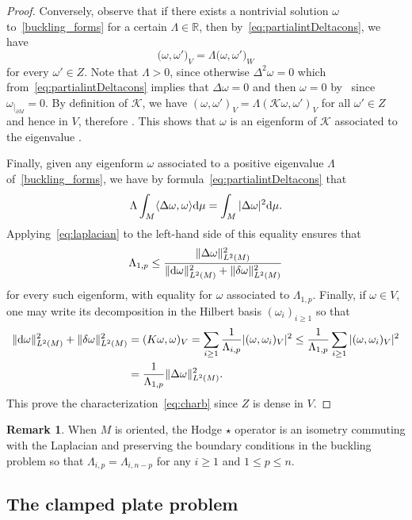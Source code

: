 \documentclass[pdftex]{sigma}
\newcommand{\R}{{\mathbb R}}
\numberwithin{equation}{section}
\theoremstyle{definition}
\newtheorem{Remark}[Theorem]{Remark}
\begin{document}
\begin{proof}
Conversely, observe that if there exists a nontrivial solution $\omega$ to~\eqref{buckling_forms} for a certain $\Lambda\in\R$, then by~\eqref{eq:partialintDeltacons}, we have
\[
\bigl(\omega,\omega'\bigr)_V=\Lambda\bigl(\omega,\omega'\bigr)_W
\]
for every $\omega'\in Z$. Note that $\Lambda>0$, since otherwise $\Delta^2\omega=0$ which from~\eqref{eq:partialintDeltacons} implies that $\Delta\omega=0$ and then $\omega=0$ by~\cite{Anne89} since $\omega_{|_{\partial M}}=0$.
By definition of $\mathcal{K}$, we have $(\omega,\omega')_V=\Lambda(\mathcal{K}\omega,\omega')_V$ for all ${\omega'\in Z}$ and hence in $V$, therefore . This shows that $\omega$ is an eigenform of $\mathcal{K}$ associated to the eigenvalue .

Finally, given any eigenform $\omega$ associated to a positive eigenvalue $\Lambda$ of~\eqref{buckling_forms}, we have by formula~\eqref{eq:partialintDeltacons} that
\[
\Lambda\int_M\langle\Delta\omega,\omega\rangle {\rm d}\mu=\int_M |\Delta \omega|^2 {\rm d}\mu.
\]
Applying~\eqref{eq:laplacian} to the left-hand side of this equality ensures that
\[
\Lambda_{1,p}\leq \frac{\|\Delta\omega\|_{L^2(M)}^2}{
\|{\rm d}\omega\|_{L^2(M)}^2+\|\delta\omega\|_{L^2(M)}^2}
\]
for every such eigenform, with equality for $\omega$ associated to $\Lambda_{1,p}$.
Finally, if $\omega\in V$, one may write its decomposition in the Hilbert basis $(\omega_i)_{i\geq 1}$ so that
\begin{align*}
\|{\rm d}\omega\|_{L^2(M)}^2+\|\delta\omega\|_{L^2(M)}^2 &=(K\omega,\omega)_V
=\sum_{i\geq 1}\frac{1}{\Lambda_{i,p}}|(\omega,\omega_i)_V|^2
 \leq \frac{1}{\Lambda_{1,p}}\sum_{i\geq 1}|(\omega,\omega_i)_V|^2\\
 &=\frac{1}{\Lambda_{ 1 ,p}}\|\Delta\omega\|_{L^2(M)}^2.
\end{align*}
This prove the characterization~\eqref{eq:charb} since $Z$ is dense in $V$.
\end{proof}

\begin{Remark}\label{SymmetryBuck}
When $M$ is oriented, the Hodge $\star$ operator is an isometry commuting with the Laplacian and preserving the boundary conditions in the buckling problem so that $\Lambda_{i,p}=\Lambda_{i,n-p}$ for any $i\geq 1$ and $1\leq p\leq n$.
\end{Remark}

\subsection{The clamped plate problem}
\end{document}
